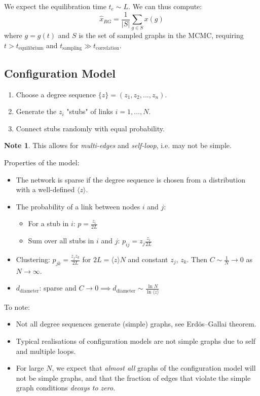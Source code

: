 \documentclass[12pt]{article}
\theoremstyle{definition}
\newtheorem{note}{Note}[section]
\begin{document}
We expect the equilibration time $t_e\sim L$. We can thus compute:
\[
\hat{x}_{RG}=\frac{1}{|S|}\sum_{g\in S} x(g)
\]
where $g=g(t)$ and $S$ is the set of sampled graphs in the MCMC, requiring $t>t_{\text{equilibrium}}$ and $t_{\text{sampling}}\gg t_{\text{correlation}}$. 

\subsection{Configuration Model}

\begin{enumerate}
    \item Choose a degree sequence $\{z\}=(z_1,z_2,...,z_n)$. 
    \item Generate the $z_i$ "stubs" of links $i=1,...,N$. 
    \item Connect stubs randomly with equal probability. 
\end{enumerate}
\begin{note}
    This allows for \textit{multi-edges} and \textit{self-loop}, i.e. may not be simple. 
\end{note}

Properties of the model: 
\begin{itemize}
    \item The network is sparse if the degree sequence is chosen from a distribution with a well-defined $\langle z\rangle$. 
    \item The probability of a link between nodes $i$ and $j$: 
    \begin{itemize}
        \item For a stub in $i$: $p=\frac{z_i}{2L}$
        \item Sum over all stubs in $i$ and $j$: $p_{ij} =z_j \frac{z_i}{2L}$
    \end{itemize}
    \item Clustering: $p_{jk}=\frac{z_jz_k}{2L}$ for $2L=\langle z\rangle N$ and constant $z_j$, $z_k$. Then $C\sim \frac{1}{N}\to 0$ as $N\to\infty$. 
    \item $d_{\text{diameter}}$: sparse and $C\to 0\implies d_{\text{diameter}}\sim \frac{\ln N}{\ln \langle z\rangle}$
\end{itemize}

To note: 
\begin{itemize}
    \item Not all degree sequences generate (simple) graphs, see Erd\"os–Gallai theorem.
    \item Typical realisations of configuration models are not simple graphs due to self and multiple loops. 
    \item For large $N$, we expect that \textit{almost all} graphs of the configuration model will not be simple graphs, and that the fraction of edges that violate the simple graph conditions \textit{decays to zero}. 
\end{itemize}
\end{document}
